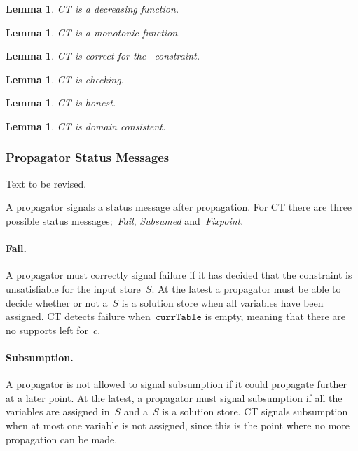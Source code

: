 \documentclass[a4paper,11pt]{article}
\newtheorem{proof}{Proof}
\newtheorem{lemma}[theorem]{Lemma}
\newcommand{\Todo}[1]{{\color{blue}#1}}
\newcommand{\Table}{\Constraint{Table}~}
\newcommand{\CurrTable}{\texttt{currTable}}
\numberwithin{equation}{section}
\begin{document}
\begin{lemma}
  CT is a decreasing function.
\end{lemma}


\begin{lemma}
  CT is a monotonic function.
\end{lemma}

\begin{lemma}
  CT is correct for the \Table constraint.
\end{lemma}

\begin{lemma}
  CT is checking.
\end{lemma}

\begin{lemma}
  CT is honest.
\end{lemma}

\begin{lemma}
  CT is domain consistent.
\end{lemma}

\subsubsection{Propagator Status Messages}
\Todo{Text to be revised.}

A propagator signals a status message after propagation.
For CT there are three possible status messages;~\emph{Fail},
\emph{Subsumed} and~\emph{Fixpoint}.

\paragraph{Fail.}
A propagator must correctly signal failure
if it has decided that the constraint is unsatisfiable for the input store~$S$.
At the latest a propagator must be
able to decide whether or not a~$S$ is a solution store when all
variables have been assigned.
CT detects failure when~$\CurrTable$ is empty, meaning that there are no
supports left for~$c$.

\paragraph{Subsumption.}
A propagator is not allowed to signal subsumption if it could propagate further
at a later point. At the latest, a propagator must signal subsumption if all the variables
are assigned in~$S$ and a~$S$ is a solution store.
CT signals subsumption when at most one variable is not assigned,
since this is the point where no more propagation can be made.
\end{document}
